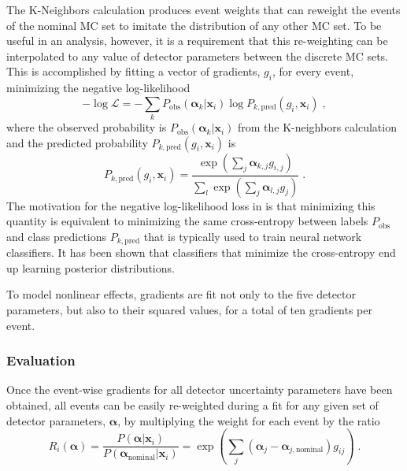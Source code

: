 The K-Neighbors calculation produces event weights that can reweight the events of the nominal MC set to imitate the distribution of any other MC set.
To be useful in an analysis, however, it is a requirement that this re-weighting can be interpolated to any value of detector parameters between the discrete MC sets.
This is accomplished by fitting a vector of gradients, $g_i$, for every event, minimizing the negative log-likelihood
\begin{equation}
    -\log\mathcal{L} = -\sum_k P_{\mathrm{obs}}(\boldsymbol{\alpha}_k | \boldsymbol{x}_i) \log P_{k, \mathrm{pred}}(g_i, \boldsymbol{x}_i)\;, \label{eq:grad-nllh}
\end{equation}
where the observed probability is $P_{\mathrm{obs}}(\boldsymbol{\alpha}_k | \boldsymbol{x}_i)$ from the K-neighbors calculation and the  predicted probability $P_{k, \mathrm{pred}}(g_i, \boldsymbol{x}_i)$ is
\begin{equation}
    P_{k, \mathrm{pred}}(g_i, \boldsymbol{x}_i) = \frac{\exp(\sum_j \boldsymbol{\alpha}_{k,j} g_{i,j})}{\sum_l\exp(\sum_j \boldsymbol{\alpha}_{l,j} g_j)}\;.
\end{equation}
The motivation for the negative log-likelihood loss in  is that minimizing this quantity is equivalent to minimizing the same cross-entropy between labels $P_{\mathrm{obs}}$ and class predictions $P_{k, \mathrm{pred}}$ that is typically used to train neural network classifiers.
It has been shown that classifiers that minimize the cross-entropy end up learning posterior distributions\cite{NNPosteriors}.

To model nonlinear effects, gradients are fit not only to the five detector parameters, but also to their squared values, for a total of ten gradients per event.

\subsubsection{Evaluation}
Once the event-wise gradients for all detector uncertainty parameters have been obtained, all events can be easily re-weighted during a fit for any given set of detector parameters, $\boldsymbol{\alpha}$, by multiplying the weight for each event by the ratio
\begin{equation}
    R_i(\boldsymbol{\alpha})=\frac{P(\boldsymbol{\alpha}|\boldsymbol{x}_i)}{P(\boldsymbol{\alpha}_\mathrm{nominal}|\boldsymbol{x}_i)}=\exp\left(\sum_j (\boldsymbol{\alpha}_j - \boldsymbol{\alpha}_{j, \mathrm{nominal}}) g_{ij}\right)\;.\label{eq:ultrasurf-eval}
\end{equation}

